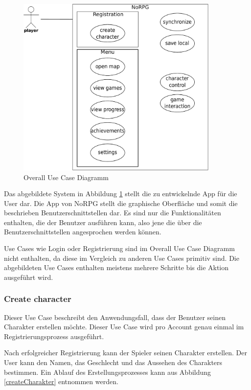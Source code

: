 		\begin{figure}[htbp]
			\centering 
			\label{oucd}
			\includegraphics[width=10cm]{pics/OUCD.pdf}
			\caption{Overall Use Case Diagramm}
		\end{figure}
		
		Das abgebildete System in Abbildung \ref{oucd} stellt die zu entwickelnde App für die User dar. Die App von NoRPG stellt die graphische Oberfläche und somit die beschrieben Benutzerschnittstellen dar. Es sind nur die Funktionalitäten enthalten, die der Benutzer ausführen kann, also jene die über die Benutzerschnittstellen angesprochen werden können. 
		
		Use Cases wie Login oder Registrierung sind im Overall Use Case Diagramm nicht enthalten, da diese im Vergleich zu anderen Use Cases primitiv sind. Die abgebildeten Use Cases enthalten meistens mehrere Schritte bis die Aktion ausgeführt wird.
	
		\subsubsection{Create character}
			Dieser Use Case beschreibt den Anwendungsfall, dass der Benutzer seinen Charakter erstellen möchte. Dieser Use Case wird pro Account genau einmal im Registrierungsprozess ausgeführt.
			
			Nach erfolgreicher Registrierung kann der Spieler seinen Charakter erstellen. Der User kann den Namen, das Geschlecht und das Aussehen des Charakters bestimmen. Ein Ablauf des Erstellungsprozesses kann aus Abbildung \ref{createCharakter} entnommen werden.
			
